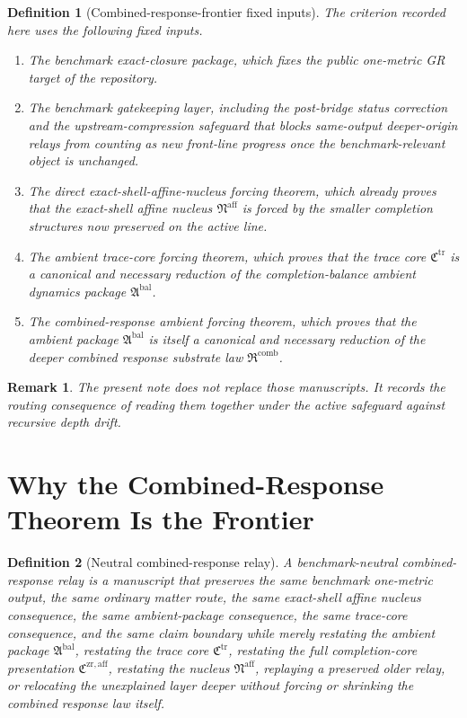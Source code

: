 \documentclass[11pt]{article}
\newcommand{\CompletionCore}{\mathfrak C^{\mathrm{zr,aff}}}
\newcommand{\TraceCore}{\mathfrak C^{\mathrm{tr}}}
\newcommand{\AffineNucleus}{\mathfrak N^{\mathrm{aff}}}
\newcommand{\AmbientPackage}{\mathfrak A^{\mathrm{bal}}}
\newcommand{\CombinedLaw}{\mathfrak R^{\mathrm{comb}}}
\newtheorem{definition}{Definition}
\newtheorem{remark}{Remark}
\begin{document}
\begin{definition}[Combined-response-frontier fixed inputs]
The criterion recorded here uses the following fixed inputs.
\begin{enumerate}
    \item The benchmark exact-closure package, which fixes the public one-metric GR target of the repository.
    \item The benchmark gatekeeping layer, including the post-bridge status correction and the upstream-compression safeguard that blocks same-output deeper-origin relays from counting as new front-line progress once the benchmark-relevant object is unchanged.
    \item The direct exact-shell-affine-nucleus forcing theorem, which already proves that the exact-shell affine nucleus \(\AffineNucleus\) is forced by the smaller completion structures now preserved on the active line.
    \item The ambient trace-core forcing theorem, which proves that the trace core \(\TraceCore\) is a canonical and necessary reduction of the completion-balance ambient dynamics package \(\AmbientPackage\).
    \item The combined-response ambient forcing theorem, which proves that the ambient package \(\AmbientPackage\) is itself a canonical and necessary reduction of the deeper combined response substrate law \(\CombinedLaw\).
\end{enumerate}
\end{definition}

\begin{remark}
The present note does not replace those manuscripts. It records the routing consequence of reading them together under the active safeguard against recursive depth drift.
\end{remark}

\section{Why the Combined-Response Theorem Is the Frontier}

\begin{definition}[Neutral combined-response relay]
A \emph{benchmark-neutral combined-response relay} is a manuscript that preserves the same benchmark one-metric output, the same ordinary matter route, the same exact-shell affine nucleus consequence, the same ambient-package consequence, the same trace-core consequence, and the same claim boundary while merely restating the ambient package \(\AmbientPackage\), restating the trace core \(\TraceCore\), restating the full completion-core presentation \(\CompletionCore\), restating the nucleus \(\AffineNucleus\), replaying a preserved older relay, or relocating the unexplained layer deeper without forcing or shrinking the combined response law itself.
\end{definition}
\end{document}

